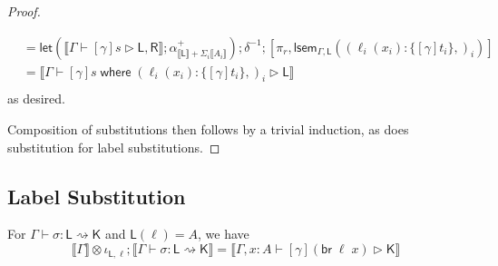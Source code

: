 \documentclass[acmsmall,screen,review]{acmart}
\newcommand{\ms}[1]{\ensuremath{\mathsf{#1}}}
\newcommand{\lto}{:}
\newcommand{\brb}[2]{\ms{br}\;#1\;#2}
\newcommand{\where}[2]{#1\;\ms{where}\;#2}
\newcommand{\wbranch}[3]{#1(#2) \lto \{#3\}}
\newcommand{\haslb}[3]{#1 \vdash #2 \rhd #3}
\newcommand{\lbsubst}[4]{#1 \vdash #2: #3 \rightsquigarrow #4}
\newcommand{\dnt}[1]{\llbracket{#1}\rrbracket}
\newcommand{\loopmor}[3]{\ms{lsem}_{#1, #3}(#2)}
\newcommand{\lmor}[1]{\ms{let}(#1)}
\begin{document}
\begin{proof}
\begin{itemize}[leftmargin=*]
\begin{equation}
\begin{aligned}
        & = \lmor{\dnt{\haslb{\Gamma}{[\gamma]s}{\ms{L}, \ms{R}}} 
            ; \alpha^+_{\dnt{\ms{L}} + \Sigma_i \dnt{A_i}}}
          ; \delta^{-1}
          ; [\pi_r, \loopmor{\Gamma}{(\wbranch{\ell_i}{x_i}{[\gamma]t_i},)_i}{\ms{L}}] \\
        & = \dnt{\haslb{\Gamma}
          {\where{[\gamma]s}
          {(\wbranch{\ell_i}{x_i}{[\gamma]t_i},)_i}}{\ms{L}}} \\
      \end{aligned}
    \end{equation}
    as desired.
  \end{itemize}
  Composition of substitutions then follows by a trivial induction, as does substitution for label
  substitutions.
\end{proof}

\subsection{Label Substitution}

\begin{lemma}
  For $\lbsubst{\Gamma}{\sigma}{\ms{L}}{\ms{K}}$ and $\ms{L}(\ell) = A$, we have
  \begin{equation}
    \dnt{\Gamma} \otimes \iota_{\ms{L}, \ell} ; \dnt{\lbsubst{\Gamma}{\sigma}{\ms{L}}{\ms{K}}}
    = \dnt{\haslb{\Gamma, x : A}{[\gamma](\brb{\ell}{x})}{\ms{K}}}
  \end{equation}
  \label{lem:lsubst-inj}
\end{lemma}
\end{document}
